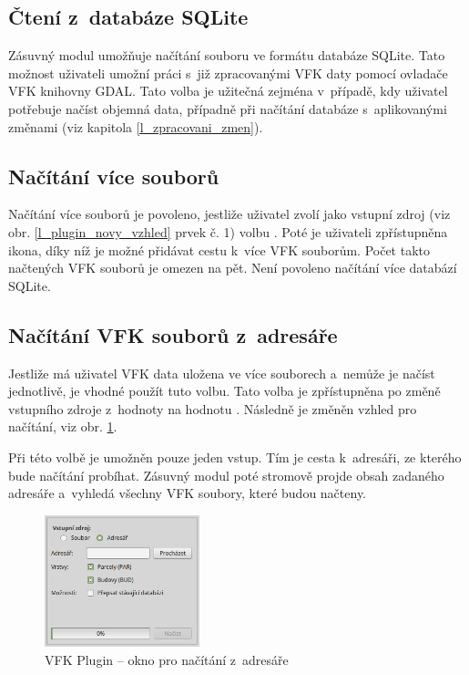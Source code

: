 \documentclass[a4paper,12pt,oneside]{book}
\begin{document}
\subsection{Čtení z~databáze SQLite}
Zásuvný modul umožňuje načítání souboru ve formátu databáze SQLite. Tato
možnost uživateli umožní práci s~již zpracovanými VFK daty pomocí ovladače
VFK knihovny GDAL. Tato volba je užitečná zejména v~případě, kdy uživatel 
potřebuje načíst objemná data, případně při načítání databáze s~aplikovanými
změnami (viz kapitola \ref{l_zpracovani_zmen}).

\subsection{Načítání více souborů}
Načítání více souborů je povoleno, jestliže uživatel zvolí jako vstupní
zdroj (viz obr. \ref{l_plugin_novy_vzhled} prvek č. 1) volbu .
Poté je uživateli zpřístupněna ikona, díky níž je možné přidávat cestu
k~více VFK souborům. Počet takto načtených VFK souborů je omezen na pět.
Není povoleno načítání více databází SQLite.

\subsection{Načítání VFK souborů z~adresáře}
Jestliže má uživatel VFK data uložena ve více souborech a~nemůže je načíst
jednotlivě, je vhodné použít tuto volbu. Tato volba je zpřístupněna po změně
vstupního zdroje z~hodnoty  na hodnotu . Následně je 
změněn vzhled  pro načítání, viz obr. \ref{l_cteni_z_adresare}.

Při této volbě je umožněn pouze jeden vstup. Tím je cesta k~adresáři, ze 
kterého bude načítání probíhat. Zásuvný modul poté stromově projde obsah 
zadaného adresáře a~vyhledá všechny VFK soubory, které budou načteny.

\begin{figure}[htb]
\centering
\includegraphics[width=0.4\textwidth]{images/vfkPlugin-cteni_adresar.png}
\caption[VFK Plugin -- okno pro načítání z~adresáře]{VFK Plugin -- okno pro načítání z~adresáře}
\label{l_cteni_z_adresare}
\end{figure}
\end{document}
